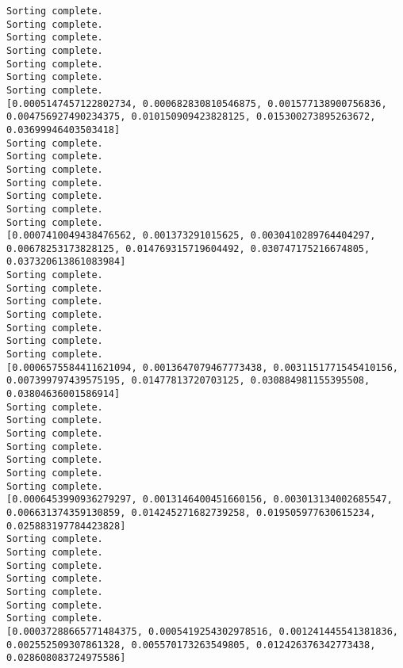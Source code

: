 \documentclass[11pt]{article}
\begin{document}
    \begin{Verbatim}[commandchars=\\\{\}]
Sorting complete.
Sorting complete.
Sorting complete.
Sorting complete.
Sorting complete.
Sorting complete.
Sorting complete.
[0.0005147457122802734, 0.000682830810546875, 0.001577138900756836,
0.004756927490234375, 0.010150909423828125, 0.015300273895263672,
0.03699946403503418]
Sorting complete.
Sorting complete.
Sorting complete.
Sorting complete.
Sorting complete.
Sorting complete.
Sorting complete.
[0.0007410049438476562, 0.001373291015625, 0.0030410289764404297,
0.00678253173828125, 0.014769315719604492, 0.030747175216674805,
0.037320613861083984]
Sorting complete.
Sorting complete.
Sorting complete.
Sorting complete.
Sorting complete.
Sorting complete.
Sorting complete.
[0.0006575584411621094, 0.0013647079467773438, 0.0031151771545410156,
0.007399797439575195, 0.01477813720703125, 0.030884981155395508,
0.03804636001586914]
Sorting complete.
Sorting complete.
Sorting complete.
Sorting complete.
Sorting complete.
Sorting complete.
Sorting complete.
[0.0006453990936279297, 0.0013146400451660156, 0.003013134002685547,
0.006631374359130859, 0.014245271682739258, 0.019505977630615234,
0.025883197784423828]
Sorting complete.
Sorting complete.
Sorting complete.
Sorting complete.
Sorting complete.
Sorting complete.
Sorting complete.
[0.00037288665771484375, 0.0005419254302978516, 0.001241445541381836,
0.002552509307861328, 0.005570173263549805, 0.012426376342773438,
0.028608083724975586]
    \end{Verbatim}

    \begin{center}
    \end{center}
    { \hspace*{\fill} \\}
    
    \begin{center}
    \end{center}
    { \hspace*{\fill} \\}
    
    \begin{center}
    \end{center}
    { \hspace*{\fill} \\}
    
\end{document}
